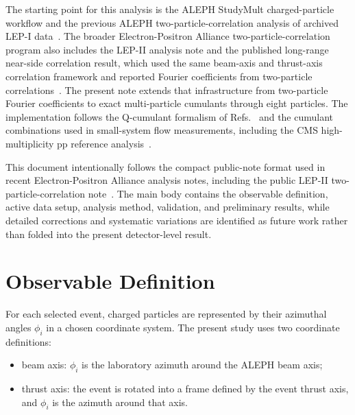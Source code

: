 \documentclass{article}
\begin{document}
The starting point for this analysis is the ALEPH StudyMult charged-particle
workflow and the previous ALEPH two-particle-correlation analysis of archived
LEP-I data~\cite{Badea:2019vey}. The broader Electron-Positron Alliance
two-particle-correlation program also includes the LEP-II analysis note and the
published long-range near-side correlation result, which used the same
beam-axis and thrust-axis correlation framework and reported Fourier
coefficients from two-particle correlations~\cite{Chen:2023eeaNote,Chen:2024lrc}.
The present note extends that infrastructure from two-particle Fourier
coefficients to exact multi-particle cumulants through eight particles. The
implementation follows the Q-cumulant formalism
of Refs.~\cite{Bilandzic:2010jr,Bilandzic:2013kga} and the cumulant
combinations used in small-system flow measurements, including the CMS
high-multiplicity pp reference analysis~\cite{CMS:2016fnw}.

This document intentionally follows the compact public-note format used in
recent Electron-Positron Alliance analysis notes, including the public LEP-II
two-particle-correlation note~\cite{Chen:2023eeaNote}. The main body contains the
observable definition, active data setup, analysis method, validation, and
preliminary results, while detailed corrections and systematic variations are
identified as future work rather than folded into the present detector-level
result.

\section{Observable Definition}
\label{sec:observable}

For each selected event, charged particles are represented by their azimuthal
angles \(\phi_i\) in a chosen coordinate system. The present study uses two
coordinate definitions:
\begin{itemize}
  \item beam axis: \(\phi_i\) is the laboratory azimuth around the ALEPH beam
  axis;
  \item thrust axis: the event is rotated into a frame defined by the event
  thrust axis, and \(\phi_i\) is the azimuth around that axis.
\end{itemize}
\end{document}
